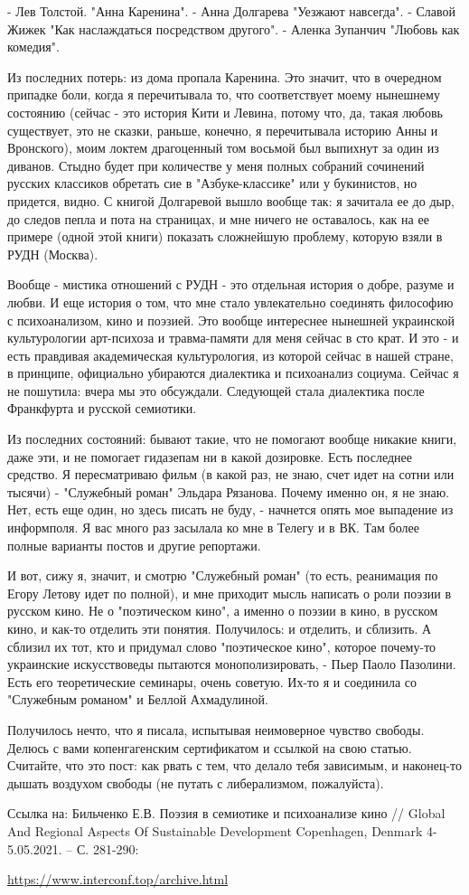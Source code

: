 - Лев Толстой. "Анна Каренина".
- Анна Долгарева "Уезжают навсегда". 
- Славой Жижек "Как наслаждаться посредством другого".
- Аленка Зупанчич "Любовь как комедия".

Из последних потерь: из дома пропала Каренина. Это значит, что в очередном
припадке боли, когда я перечитывала то, что соответствует моему нынешнему
состоянию (сейчас - это история Кити и Левина, потому что, да, такая любовь
существует, это не сказки, раньше, конечно, я перечитывала историю Анны и
Вронского), моим локтем  драгоценный том восьмой был выпихнут за один из
диванов. Стыдно будет при количестве у меня полных собраний сочинений русских
классиков обретать сие в "Азбуке-классике" или у букинистов, но придется,
видно. С книгой Долгаревой вышло вообще так: я зачитала ее до дыр, до следов
пепла и пота на страницах, и мне ничего не оставалось, как на ее примере (одной
этой книги) показать сложнейшую проблему, которую взяли в РУДН (Москва).

Вообще - мистика отношений с РУДН - это отдельная история о добре, разуме и
любви. И еще история о том, что мне стало увлекательно соединять философию с
психоанализом, кино и поэзией. Это вообще интереснее нынешней украинской
культурологии арт-психоза и травма-памяти для меня сейчас в сто крат. И это - и
есть правдивая академическая культурология, из которой сейчас в нашей стране, в
принципе, официально убираются диалектика и психоанализ социума. Сейчас я не
пошутила: вчера мы это обсуждали. Следующей стала диалектика после Франкфурта и
русской семиотики. 

Из последних состояний: бывают такие, что не помогают вообще никакие книги,
даже эти, и не помогает гидазепам ни в какой дозировке. Есть последнее
средство. Я пересматриваю фильм (в какой раз, не знаю, счет идет на сотни или
тысячи) - "Служебный роман" Эльдара Рязанова. Почему именно он, я не знаю. Нет,
есть еще один, но здесь писать не буду, - начнется опять мое выпадение из
информполя. Я вас много раз засылала ко мне в Телегу и в ВК. Там более полные
варианты постов и другие репортажи.

И вот, сижу я, значит, и смотрю "Служебный роман" (то есть, реанимация по Егору
Летову идет по полной), и мне приходит мысль написать о роли поэзии в русском
кино. Не о "поэтическом кино", а именно о поэзии в кино, в русском кино, и
как-то отделить эти понятия. Получилось: и отделить, и сблизить. А сблизил их
тот, кто и придумал слово "поэтическое кино", которое почему-то украинские
искусствоведы пытаются монополизировать, - Пьер Паоло Пазолини. Есть его
теоретические семинары, очень советую. Их-то я и соединила со "Служебным
романом" и Беллой Ахмадулиной. 

Получилось нечто, что я писала, испытывая неимоверное чувство свободы. Делюсь с
вами копенгагенским сертификатом и ссылкой на свою статью. Считайте, что это
пост: как рвать с тем, что делало тебя зависимым, и наконец-то дышать воздухом
свободы (не путать с либерализмом, пожалуйста). 

Ссылка на: Бильченко Е.В. Поэзия в семиотике и психоанализе кино // Global And
Regional Aspects Of Sustainable Development Copenhagen, Denmark 4-5.05.2021. –
С. 281-290:

\url{https://www.interconf.top/archive.html}
